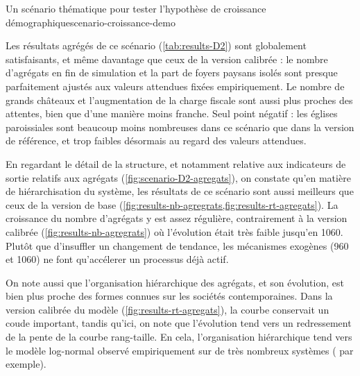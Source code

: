 \begin{encadre}{Un scénario thématique pour tester l'hypothèse de croissance démographique}{scenario-croissance-demo}

\smallskip

\vspace*{1em} Les résultats agrégés de ce scénario (\cref{tab:results-D2}) sont globalement satisfaisants, et même davantage que ceux de la version calibrée : le nombre d'agrégats en fin de simulation et la part de foyers paysans isolés sont presque parfaitement ajustés aux valeurs attendues fixées empiriquement.
Le nombre de grands châteaux et l'augmentation de la charge fiscale sont aussi plus proches des attentes, bien que d'une manière moins franche.
Seul point négatif : les églises paroissiales sont beaucoup moins nombreuses dans ce scénario que dans la version de référence, et trop faibles désormais au regard des valeurs attendues.

\vspace*{1em} En regardant le détail de la structure, et notamment relative aux indicateurs de sortie relatifs aux agrégats (\cref{fig:scenario-D2-agregats}), on constate qu'en matière de hiérarchisation du système, les résultats de ce scénario sont aussi meilleurs que ceux de la version de base (\cref{fig:results-nb-agregrats,fig:results-rt-agregats}).
La croissance du nombre d'agrégats y est assez régulière, contrairement à la version calibrée (\cref{fig:results-nb-agregrats}) où l'évolution était très faible jusqu'en 1060.
Plutôt que d'insuffler un changement de tendance, les mécanismes exogènes (960 et 1060) ne font qu'accélerer un processus déjà actif.

On note aussi que l'organisation hiérarchique des agrégats, et son évolution, est bien plus proche des formes connues sur les sociétés contemporaines.
Dans la version calibrée du modèle (\cref{fig:results-rt-agregats}), la courbe conservait un \og coude\fg{} important, tandis qu'ici, on note que l'évolution tend vers un redressement de la pente de la courbe rang-taille.
En cela, l'organisation hiérarchique tend vers le modèle log-normal observé empiriquement sur de très nombreux systèmes (\textcite{cura_old_2017} par exemple).


\end{encadre}
